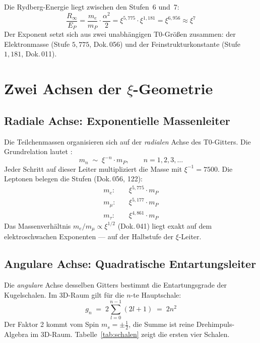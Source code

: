 Die Rydberg-Energie liegt zwischen den Stufen~6 und~7:
\begin{equation}
  \frac{R_\infty}{E_P}
  = \frac{m_e}{m_P} \cdot \frac{\alpha^2}{2}
  = \xi^{5{,}775} \cdot \xi^{1{,}181}
  = \xi^{6{,}956}
  \approx \xi^7
\end{equation}
Der Exponent setzt sich aus zwei unabhängigen T0-Größen zusammen:
der Elektronmasse (Stufe $5{,}775$, Dok.\,056) und der Feinstrukturkonstante
(Stufe $1{,}181$, Dok.\,011).

\section{Zwei Achsen der \texorpdfstring{$\xi$}{xi}-Geometrie}
\label{sec:zwei-achsen}

\subsection{Radiale Achse: Exponentielle Massenleiter}
\label{subsec:radial}

Die Teilchenmassen organisieren sich auf der \emph{radialen} Achse des
T0-Gitters. Die Grundrelation lautet \cite{dok009}:
\begin{equation}
  m_n \;\sim\; \xi^{-n} \cdot m_P, \qquad n = 1, 2, 3, \ldots
\end{equation}
Jeder Schritt auf dieser Leiter multipliziert die Masse mit
$\xi^{-1} = 7500$.
Die Leptonen belegen die Stufen (Dok.\,056, 122):
\begin{align}
  m_e:  &\quad \xi^{5{,}775} \cdot m_P \\
  m_\mu:&\quad \xi^{5{,}177} \cdot m_P \\
  m_\tau:&\quad \xi^{4{,}861} \cdot m_P
\end{align}
Das Massenverhältnis $m_e/m_\mu \propto \xi^{1/2}$ (Dok.\,041) liegt
exakt auf dem elektroschwachen Exponenten — auf der Halbstufe der
$\xi$-Leiter.

\subsection{Angulare Achse: Quadratische Entartungsleiter}
\label{subsec:angular}

Die \emph{angulare} Achse desselben Gitters bestimmt die Entartungsgrade
der Kugelschalen. Im 3D-Raum gilt für die $n$-te Hauptschale:
\begin{equation}
  g_n \;=\; 2 \sum_{l=0}^{n-1} (2l+1) \;=\; 2n^2
  \label{eq:gn}
\end{equation}
Der Faktor 2 kommt vom Spin $m_s = \pm\frac{1}{2}$, die Summe ist reine
Drehimpuls-Algebra im 3D-Raum. Tabelle~\ref{tab:schalen} zeigt die ersten
vier Schalen.


